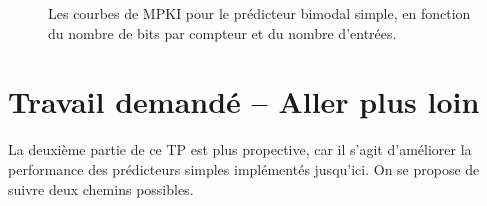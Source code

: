 \documentclass[a4paper]{article}
\begin{document}
\begin{figure}[h]
{      \label{plot3}
      }
      \caption{\label{results}Les courbes de MPKI pour le prédicteur bimodal simple, en fonction du nombre de bits par compteur et du nombre d'entrées.}
      \end{figure}

\clearpage
\section{Travail demandé -- Aller plus loin}

La deuxième partie de ce TP est plus propective, car il s'agit d'améliorer la performance des prédicteurs simples implémentés jusqu'ici. On se propose de suivre deux chemins possibles. \\
\end{document}

